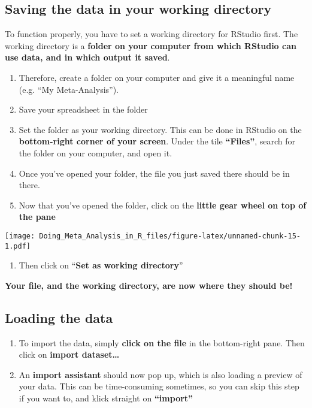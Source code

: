 \documentclass[]{book}
\providecommand{\tightlist}{%
  \setlength{\itemsep}{0pt}\setlength{\parskip}{0pt}}
\theoremstyle{definition}
\theoremstyle{definition}
\theoremstyle{definition}
\theoremstyle{remark}
\begin{document}
\subsection{Saving the data in your working
directory}\label{saving-the-data-in-your-working-directory}

To function properly, you have to set a working directory for RStudio
first. The working directory is a \textbf{folder on your computer from
which RStudio can use data, and in which output it saved}.

\begin{enumerate}
\def\labelenumi{\arabic{enumi}.}
\tightlist
\item
  Therefore, create a folder on your computer and give it a meaningful
  name (e.g. ``My Meta-Analysis'').
\item
  Save your spreadsheet in the folder
\item
  Set the folder as your working directory. This can be done in RStudio
  on the \textbf{bottom-right corner of your screen}. Under the tile
  \textbf{``Files''}, search for the folder on your computer, and open
  it.
\item
  Once you've opened your folder, the file you just saved there should
  be in there.
\item
  Now that you've opened the folder, click on the \textbf{little gear
  wheel on top of the pane}
\end{enumerate}

\texttt{[image: Doing\_Meta\_Analysis\_in\_R\_files/figure-latex/unnamed-chunk-15-1.pdf]}

\begin{enumerate}
\def\labelenumi{\arabic{enumi}.}
\setcounter{enumi}{5}
\tightlist
\item
  Then click on ``\textbf{Set as working directory}''
\end{enumerate}

\textbf{Your file, and the working directory, are now where they should
be!}

\subsection{Loading the data}\label{loading-the-data}

\begin{enumerate}
\def\labelenumi{\arabic{enumi}.}
\tightlist
\item
  To import the data, simply \textbf{click on the file} in the
  bottom-right pane. Then click on \textbf{import dataset\ldots{}}
\item
  An \textbf{import assistant} should now pop up, which is also loading
  a preview of your data. This can be time-consuming sometimes, so you
  can skip this step if you want to, and klick straight on
  \textbf{``import''}
\end{enumerate}
\end{document}
